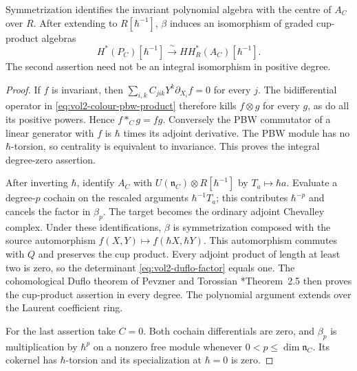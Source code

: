 \begin{proposition}\label{prop:vol2-colour-duflo}
Symmetrization identifies the invariant polynomial
algebra with the centre of $A_C$ over $R$.
After extending to $R[\hbar^{-1}]$, $\beta$ induces
an isomorphism of graded cup-product algebras
\[
 H^*(P_C)[\hbar^{-1}]
   \xrightarrow{\ \sim\ }HH_R^*(A_C)[\hbar^{-1}].
\]
The second assertion need not be an integral
isomorphism in positive degree.
\end{proposition}
\begin{proof}
If $f$ is invariant, then
$\sum_{i,k}C_{jik}Y^k\partial_{X_i}f=0$ for every $j$.
The bidifferential operator in
\eqref{eq:vol2-colour-pbw-product} therefore kills
$f\otimes g$ for every $g$, as do all its positive
powers. Hence $f*_Cg=fg$.
Conversely the PBW commutator of a linear generator
with $f$ is $\hbar$ times its adjoint derivative.
The PBW module has no $\hbar$-torsion, so centrality
is equivalent to invariance. This proves the
integral degree-zero assertion.

After inverting $\hbar$, identify $A_C$ with
$U(\mathfrak n_C)\otimes R[\hbar^{-1}]$ by
$T_a\mapsto\hbar a$.
Evaluate a degree-$p$ cochain on the rescaled
arguments $\hbar^{-1}T_a$; this contributes
$\hbar^{-p}$ and cancels the factor in $\beta_p$.
The target becomes the ordinary adjoint Chevalley
complex. Under these identifications, $\beta$ is
symmetrization composed with the source automorphism
$f(X,Y)\mapsto f(\hbar X,\hbar Y)$.
This automorphism commutes with $Q$ and preserves
the cup product.
Every adjoint product of length at least two is
zero, so the determinant
\eqref{eq:vol2-duflo-factor} equals one.
The cohomological Duflo theorem of Pevzner and
Torossian \cite{PevznerTorossianDuflo}*{Theorem~2.5}
then proves the cup-product assertion in every
degree. The polynomial argument extends over the
Laurent coefficient ring.

For the last assertion take $C=0$.
Both cochain differentials are zero, and $\beta_p$
is multiplication by $\hbar^p$ on a nonzero free
module whenever $0<p\leq\dim\mathfrak n_C$.
Its cokernel has $\hbar$-torsion and its
specialization at $\hbar=0$ is zero.
\end{proof}

